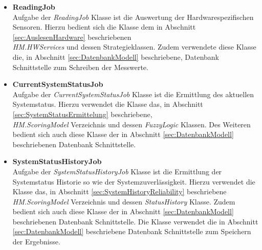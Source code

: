 \begin{itemize}
    \item \textbf{ReadingJob}\\
    Aufgabe der \textit{ReadingJob} Klasse ist die Auswertung der Hardwarespezifischen Sensoren. Hierzu bedient sich die Klasse dem in Abschnitt \ref{sec:AuslesenHardware} beschriebenen\\ \textit{HM.HWServices} und dessen Strategieklassen. Zudem verwendete diese Klasse die, in Abschnitt \ref{sec:DatenbankModell} beschriebene, Datenbank Schnittstelle zum Schreiben der Messwerte. 
    \item \textbf{CurrentSystemStatusJob}\\
    Aufgabe der \textit{CurrentSystemStatusJob} Klasse ist die Ermittlung des aktuellen Systemstatus. Hierzu verwendet die Klasse das, in Abschnitt \ref{sec:SystemStatusErmittelung} beschriebene, \\\textit{HM.ScoringModel} Verzeichnis und dessen \textit{FuzzyLogic} Klassen. Des Weiteren bedient sich auch diese Klasse der in Abschnitt \ref{sec:DatenbankModell} beschriebenen Datenbank Schnittstelle.
    \item \textbf{SystemStatusHistoryJob}\\
    Aufgabe der \textit{SystemStatusHistoryJob} Klasse ist die Ermittlung der Systemstatus Historie so wie der Systemzuverlässigkeit. Hierzu verwendet die Klasse das, in Abschnitt \ref{sec:SystemHistoryReliability} beschriebene \textit{HM.ScoringModel} Verzeichnis und dessen \textit{StatusHistory} Klasse. Zudem bedient sich auch diese Klasse der in Abschnitt \ref{sec:DatenbankModell} beschriebenen Datenbank Schnittstelle. Die Klasse verwendet die in Abschnitt \ref{sec:DatenbankModell} beschriebene Datenbank Schnittstelle zum Speichern der Ergebnisse.    
\end{itemize}
